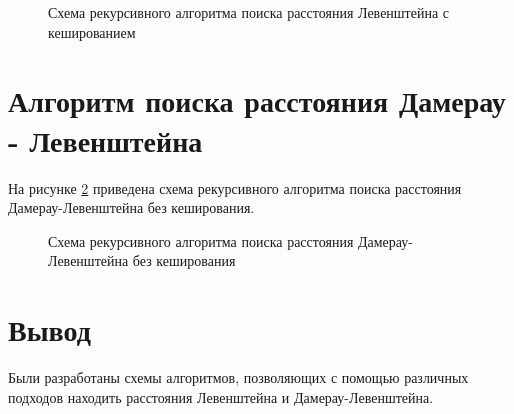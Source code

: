 \begin{figure}[h!]
	
		
	\caption{Схема рекурсивного алгоритма поиска расстояния Левенштейна с кешированием}
		
	\label{fig:l_recursion_matrix}
		
\end{figure}


\section{Алгоритм поиска расстояния Дамерау - Левенштейна}

На рисунке \ref{fig:Dl_recursion} приведена схема рекурсивного алгоритма поиска расстояния Дамерау-Левенштейна без кеширования.

\begin{figure}[h!]
	
		
		\caption{Схема рекурсивного алгоритма поиска расстояния Дамерау-Левенштейна  без кеширования}
		
		\label{fig:Dl_recursion}
		
	\end{figure}




\section*{Вывод}

Были разработаны схемы алгоритмов, позволяющих с помощью различных подходов находить расстояния Левенштейна и Дамерау-Левенштейна.


